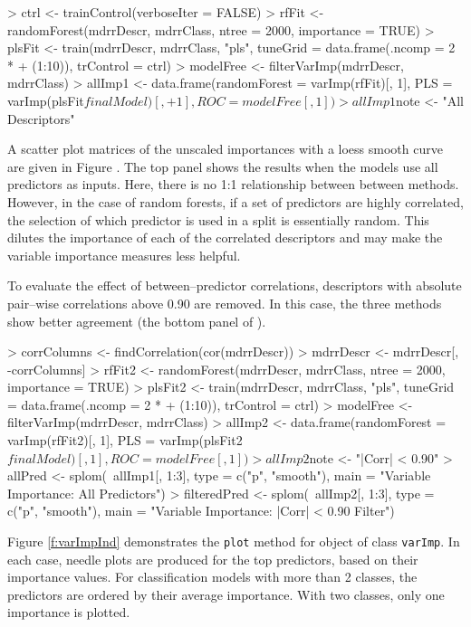 \documentclass[12pt]{article}
\begin{document}
\begin{Schunk}
\begin{Sinput}
> ctrl <- trainControl(verboseIter = FALSE)
> rfFit <- randomForest(mdrrDescr, mdrrClass, ntree = 2000, importance = TRUE)
> plsFit <- train(mdrrDescr, mdrrClass, "pls", tuneGrid = data.frame(.ncomp = 2 * 
+     (1:10)), trControl = ctrl)
> modelFree <- filterVarImp(mdrrDescr, mdrrClass)
> allImp1 <- data.frame(randomForest = varImp(rfFit)[, 1], PLS = varImp(plsFit$finalModel)[, 
+     1], ROC = modelFree[, 1])
> allImp1$note <- "All Descriptors"
\end{Sinput}
\end{Schunk}

A scatter plot matrices of the unscaled importances with a loess smooth curve are given in Figure \label{f:varImpSplom}. The top panel shows the results when the models use all predictors as inputs. Here, there is no 1:1 relationship between between methods. However, in the case of random forests, if a set of predictors are highly correlated, the selection of which predictor is used in a split is essentially random. This dilutes the importance of each of the correlated descriptors and may make the variable importance measures less helpful. 

To evaluate the effect of between--predictor correlations, descriptors with absolute pair--wise correlations above 0.90 are removed. In this case, the three methods show better agreement (the bottom panel of \label{f:varImpSplom}). 

\begin{Schunk}
\begin{Sinput}
> corrColumns <- findCorrelation(cor(mdrrDescr))
> mdrrDescr <- mdrrDescr[, -corrColumns]
> rfFit2 <- randomForest(mdrrDescr, mdrrClass, ntree = 2000, importance = TRUE)
> plsFit2 <- train(mdrrDescr, mdrrClass, "pls", tuneGrid = data.frame(.ncomp = 2 * 
+     (1:10)), trControl = ctrl)
> modelFree <- filterVarImp(mdrrDescr, mdrrClass)
> allImp2 <- data.frame(randomForest = varImp(rfFit2)[, 1], PLS = varImp(plsFit2$finalModel)[, 1], ROC = modelFree[, 1])
> allImp2$note <- "|Corr| < 0.90"
> allPred <- splom(~allImp1[, 1:3], type = c("p", "smooth"), main = "Variable Importance: All Predictors")
> filteredPred <- splom(~allImp2[, 1:3], type = c("p", "smooth"), main = "Variable Importance: |Corr| < 0.90 Filter")
\end{Sinput}
\end{Schunk}

Figure \ref{f:varImpInd} demonstrates the \texttt{plot} method for object of class \texttt{varImp}. In each case, needle plots are produced for the top predictors, based on their importance values. For classification models with more than 2 classes, the predictors are ordered by their average importance. With two classes, only one importance is plotted.
\end{document}
